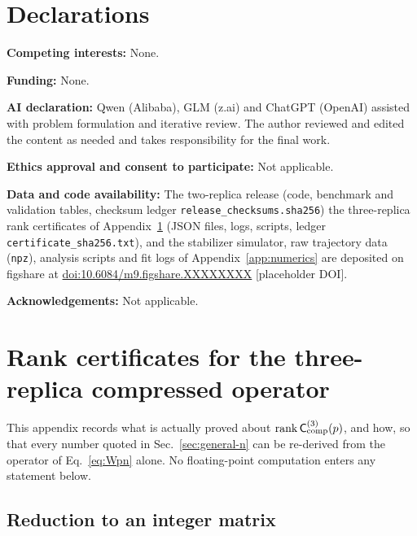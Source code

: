 \documentclass[aps,prx,reprint,superscriptaddress,nobibnotes,longbibliography]{revtex4-2}
\theoremstyle{remark}
\newcommand{\rk}{\operatorname{rank}}
\newcommand{\Ccomp}{\mathsf C_{\rm comp}}
\begin{document}
\section*{Declarations}

\noindent\textbf{Competing interests:} None.

\noindent\textbf{Funding:} None.

\noindent\textbf{AI declaration:} Qwen (Alibaba), GLM (z.ai) and ChatGPT (OpenAI) assisted with problem formulation and iterative review.  The author reviewed and edited the content as needed and takes responsibility for the final work.

\noindent\textbf{Ethics approval and consent to participate:} Not applicable.

\noindent\textbf{Data and code availability:} The two-replica release (code, benchmark and validation tables, checksum ledger \texttt{release\_checksums.sha256}) the three-replica rank certificates of Appendix~\ref{app:rank3} (JSON files, logs, scripts, ledger \texttt{certificate\_sha256.txt}), and the stabilizer simulator, raw trajectory data (\texttt{npz}), analysis scripts and fit logs of Appendix~\ref{app:numerics} are deposited on figshare at \href{https://doi.org/10.6084/m9.figshare.XXXXXXXX}{doi:10.6084/m9.figshare.XXXXXXXX} [placeholder DOI].

\noindent\textbf{Acknowledgements:} Not applicable.

\appendix
\section{Rank certificates for the three-replica compressed operator}
\label{app:rank3}

This appendix records what is actually proved about $\rk\Ccomp^{(3)}(p)$, and how, so that every number quoted in Sec.~\ref{sec:general-n} can be re-derived from the operator of Eq.~\eqref{eq:Wpn} alone.  No floating-point computation enters any statement below.

\subsection{Reduction to an integer matrix}
\label{app:reduction}
\end{document}
